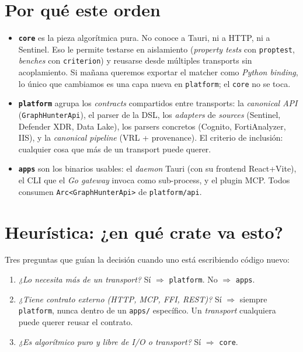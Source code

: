 \section{Por qué este orden}

\begin{itemize}
    \item \textbf{\texttt{core}} es la pieza algorítmica pura. No
    conoce a Tauri, ni a HTTP, ni a Sentinel. Eso le permite testarse
    en aislamiento (\emph{property tests} con \texttt{proptest},
    \emph{benches} con \texttt{criterion}) y reusarse desde múltiples
    transports sin acoplamiento. Si mañana queremos exportar el
    matcher como \emph{Python binding}, lo único que cambiamos es
    una capa nueva en \texttt{platform}; el \texttt{core} no se
    toca.
    \item \textbf{\texttt{platform}} agrupa los \emph{contracts}
    compartidos entre transports: la \emph{canonical API}
    (\texttt{GraphHunterApi}), el parser de la DSL, los \emph{adapters}
    de \emph{sources} (Sentinel, Defender XDR, Data Lake), los
    parsers concretos (Cognito, FortiAnalyzer, IIS), y la
    \emph{canonical pipeline} (VRL + provenance). El criterio de
    inclusión: cualquier cosa que más de un transport puede querer.
    \item \textbf{\texttt{apps}} son los binarios usables: el
    \emph{daemon} Tauri (con su frontend React+Vite), el CLI que el
    \emph{Go gateway} invoca como sub-process, y el plugin MCP. Todos
    consumen \texttt{Arc<GraphHunterApi>} de \texttt{platform/api}.
\end{itemize}

\section{Heurística: ¿en qué crate va esto?}

Tres preguntas que guían la decisión cuando uno está escribiendo
código nuevo:

\begin{enumerate}
    \item \emph{¿Lo necesita más de un transport?}
    Sí $\Rightarrow$ \texttt{platform}. No $\Rightarrow$ \texttt{apps}.
    \item \emph{¿Tiene contrato externo (HTTP, MCP, FFI, REST)?}
    Sí $\Rightarrow$ siempre \texttt{platform}, nunca dentro de un
    \texttt{apps/} específico. Un \emph{transport} cualquiera puede
    querer reusar el contrato.
    \item \emph{¿Es algorítmico puro y libre de I/O o transport?}
    Sí $\Rightarrow$ \texttt{core}.
\end{enumerate}

